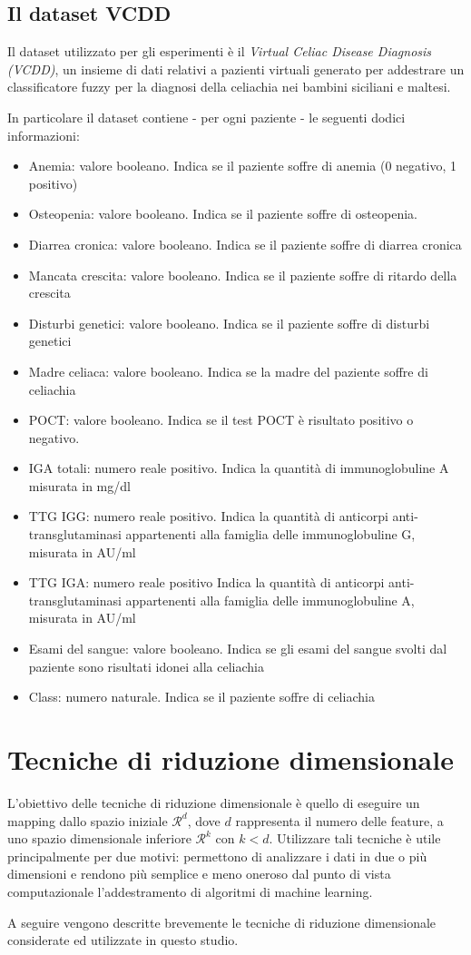 \documentclass[11pt,a4paper,twocolumn]{article}
\begin{document}
\subsection{Il dataset VCDD}
Il dataset utilizzato per gli esperimenti è il \emph{Virtual Celiac Disease Diagnosis (VCDD)}, un insieme di dati relativi a pazienti virtuali generato per addestrare un classificatore fuzzy per la diagnosi della celiachia nei bambini siciliani e maltesi.\par
In particolare il dataset contiene - per ogni paziente - le seguenti dodici informazioni:
\begin{itemize}
	\item Anemia: valore booleano. Indica se il paziente soffre di anemia (0 negativo, 1 positivo)
	\item Osteopenia: valore booleano. Indica se il paziente soffre di osteopenia.
	\item Diarrea cronica: valore booleano. Indica se il paziente soffre di diarrea cronica
	\item Mancata crescita: valore booleano. Indica se il paziente soffre di ritardo della crescita
	\item Disturbi genetici: valore booleano. Indica se il paziente soffre di disturbi genetici
	\item Madre celiaca: valore booleano. Indica se la madre del paziente soffre di celiachia
	\item POCT: valore booleano. Indica se il test POCT è risultato positivo o negativo.
	\item IGA totali: numero reale positivo. Indica la quantità di immunoglobuline A misurata in mg/dl
	\item TTG IGG: numero reale positivo. Indica la quantità di anticorpi anti-transglutaminasi appartenenti alla famiglia delle immunoglobuline G, misurata in AU/ml
	\item TTG IGA: numero reale positivo Indica la quantità di anticorpi anti-transglutaminasi appartenenti alla famiglia delle immunoglobuline A, misurata in AU/ml
	\item Esami del sangue: valore booleano. Indica se gli esami del sangue svolti dal paziente sono risultati idonei alla celiachia
	\item Class: numero naturale. Indica se il paziente soffre di celiachia
\end{itemize}
\section{Tecniche di riduzione dimensionale}
L'obiettivo delle tecniche di riduzione dimensionale è quello di eseguire un mapping dallo spazio iniziale $ \mathcal{R}^d$, dove $ d $ rappresenta il numero delle feature, a uno spazio dimensionale inferiore  $ \mathcal{R}^k$ con $ k<d $. Utilizzare tali tecniche è utile principalmente per due motivi: permettono di analizzare i dati in due o più dimensioni e rendono più semplice e meno oneroso dal punto di vista computazionale l'addestramento di algoritmi di machine learning. \par
A seguire vengono descritte brevemente le tecniche di riduzione dimensionale considerate ed utilizzate in questo studio.
\end{document}
